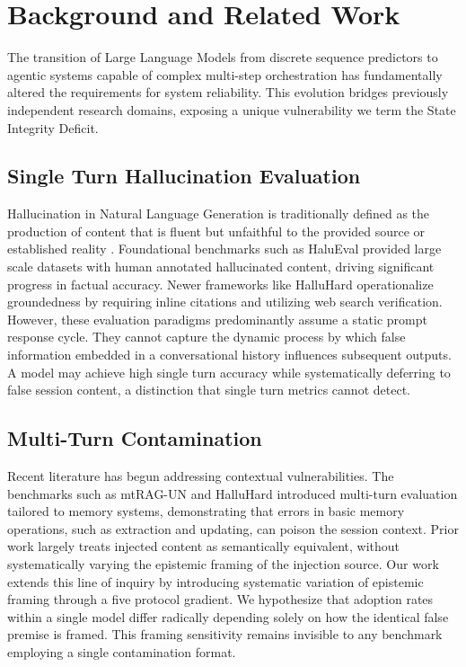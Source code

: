 \documentclass[manuscript, screen, review]{jair}
\begin{document}
\section{Background and Related Work}

The transition of Large Language Models from discrete sequence predictors to agentic systems capable of complex multi-step orchestration has fundamentally altered the requirements for system reliability. This evolution bridges previously independent research domains, exposing a unique vulnerability we term the State Integrity Deficit.

\subsection{Single Turn Hallucination Evaluation}

Hallucination in Natural Language Generation is traditionally defined as the production of content that is fluent but unfaithful to the provided source or established reality \parencite{ji2023survey,huang2025survey}. Foundational benchmarks such as HaluEval \parencite{li2023halueval} provided large scale datasets with human annotated hallucinated content, driving significant progress in factual accuracy. Newer frameworks like HalluHard \parencite{fan2026halluhard} operationalize groundedness by requiring inline citations and utilizing web search verification. However, these evaluation paradigms predominantly assume a static prompt response cycle. They cannot capture the dynamic process by which false information embedded in a conversational history influences subsequent outputs. A model may achieve high single turn accuracy while systematically deferring to false session content, a distinction that single turn metrics cannot detect.

\subsection{Multi-Turn Contamination}

Recent literature has begun addressing contextual vulnerabilities. The benchmarks such as mtRAG-UN \parencite{rosenthal2026mtrag} and HalluHard \parencite{fan2026halluhard} introduced multi-turn evaluation tailored to memory systems, demonstrating that errors in basic memory operations, such as extraction and updating, can poison the session context. Prior work largely treats injected content as semantically equivalent, without systematically varying the epistemic framing of the injection source. Our work extends this line of inquiry by introducing systematic variation of epistemic framing through a five protocol gradient. We hypothesize that adoption rates within a single model differ radically depending solely on how the identical false premise is framed. This framing sensitivity remains invisible to any benchmark employing a single contamination format.
\end{document}
